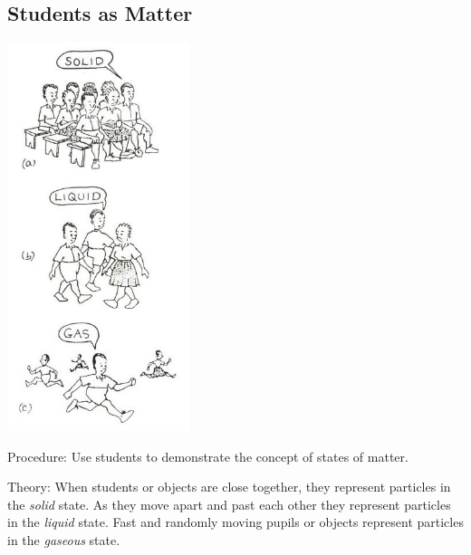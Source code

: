 \begin{multicols}{2}
\subsection{Students as Matter}

\begin{center}
\includegraphics[width=0.4\textwidth]{./img/source/states-matter-students.jpg}
\end{center}

\begin{description*}
\item[Procedure:]{Use students to demonstrate the concept of states of matter.}
\item[Theory:]{When students or objects are close together, they represent particles in the \emph{solid} state. As they move apart and past each other they represent particles in the \emph{liquid} state. Fast and randomly moving pupils or objects represent particles in the \emph{gaseous} state.}
\end{description*}


\end{multicols}
